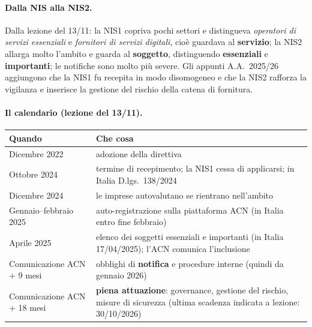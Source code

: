 \paragraph{Dalla NIS alla NIS2.} Dalla lezione del 13/11: la NIS1 copriva pochi settori e distingueva
\emph{operatori di servizi essenziali} e \emph{fornitori di servizi digitali}, cioè guardava al
\textbf{servizio}; la NIS2 allarga molto l'ambito e guarda al \textbf{soggetto}, distinguendo
\textbf{essenziali} e \textbf{importanti}; le notifiche sono molto più severe. Gli appunti A.A.~2025/26
aggiungono che la NIS1 fu recepita in modo disomogeneo e che la NIS2 rafforza la vigilanza e inserisce
la gestione del rischio della catena di fornitura.

\paragraph{Il calendario (lezione del 13/11).}
\begin{center}
\small
\begin{tabularx}{\linewidth}{>{\raggedright\arraybackslash}p{3.6cm} X}
\toprule
\textbf{Quando} & \textbf{Che cosa}\\
\midrule
Dicembre 2022 & adozione della direttiva\\
Ottobre 2024 & termine di recepimento; la NIS1 cessa di applicarsi; in Italia D.lgs.~138/2024\\
Dicembre 2024 & le imprese autovalutano se rientrano nell'ambito\\
Gennaio--febbraio 2025 & auto-registrazione sulla piattaforma ACN (in Italia entro fine febbraio)\\
Aprile 2025 & elenco dei soggetti essenziali e importanti (in Italia 17/04/2025); l'ACN comunica
  l'inclusione\\
Comunicazione ACN + 9 mesi & obblighi di \textbf{notifica} e procedure interne (quindi da gennaio
  2026)\\
Comunicazione ACN + 18 mesi & \textbf{piena attuazione}: governance, gestione del rischio, misure
  di sicurezza (ultima scadenza indicata a lezione: 30/10/2026)\\
\bottomrule
\end{tabularx}
\end{center}
